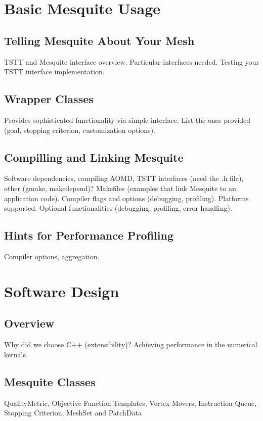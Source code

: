 \section{Basic Mesquite Usage}

\subsection{Telling Mesquite About Your Mesh}
TSTT and Mesquite interface overview. Particular interfaces needed. 
Testing your TSTT interface implementation.

\subsection{Wrapper Classes}
Provides sophisticated functionality via simple interface. List the ones
provided (goal, stopping criterion, customization options).

\subsection{Compilling and Linking Mesquite}
Software dependencies, compiling AOMD, TSTT interfaces (need the .h file),
other (gmake, makedepend)?  Makefiles (examples that link Mesquite to an 
application code). Compiler flags and options (debugging, profiling). 
Platforms supported. Optional functionalities (debugging, profiling, 
error handling). 

\subsection{Hints for Performance Profiling}
Compiler options, aggregation.

\section{Software Design}

\subsection{Overview}
Why did we choose C++ (extensibility)? Achieving performance in the 
numerical kernals.

\subsection{Mesquite Classes}
QualityMetric, Objective Function Templates, Vertex Movers, Instruction Queue,
Stopping Criterion, MeshSet and PatchData

